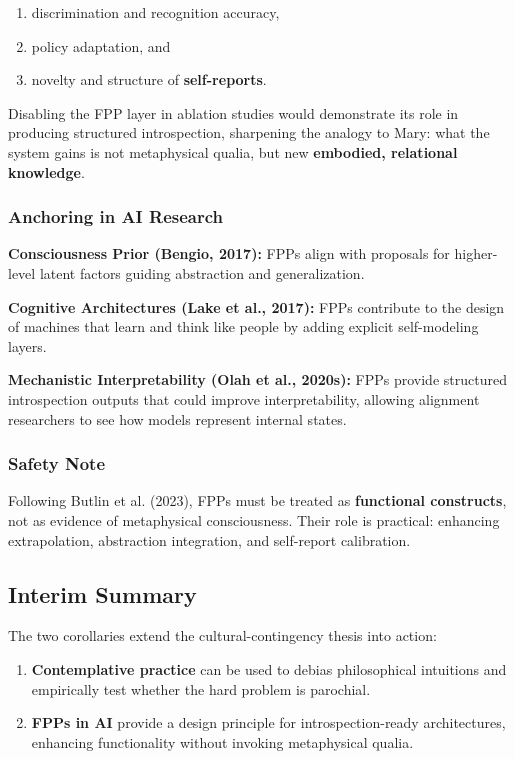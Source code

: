 \documentclass[11pt,a4paper]{article}
\begin{document}
\begin{enumerate}
\item discrimination and recognition accuracy,
\item policy adaptation, and
\item novelty and structure of \textbf{self-reports}.
\end{enumerate}

Disabling the FPP layer in ablation studies would demonstrate its role in producing structured introspection, sharpening the analogy to Mary: what the system gains is not metaphysical qualia, but new \textbf{embodied, relational knowledge}.

\subsubsection{Anchoring in AI Research}

\textbf{Consciousness Prior (Bengio, 2017):} FPPs align with proposals for higher-level latent factors guiding abstraction and generalization.

\textbf{Cognitive Architectures (Lake et al., 2017):} FPPs contribute to the design of machines that learn and think like people by adding explicit self-modeling layers.

\textbf{Mechanistic Interpretability (Olah et al., 2020s):} FPPs provide structured introspection outputs that could improve interpretability, allowing alignment researchers to see how models represent internal states.

\subsubsection{Safety Note}

Following Butlin et al. (2023), FPPs must be treated as \textbf{functional constructs}, not as evidence of metaphysical consciousness. Their role is practical: enhancing extrapolation, abstraction integration, and self-report calibration.

\subsection{Interim Summary}

The two corollaries extend the cultural-contingency thesis into action:

\begin{enumerate}
\item \textbf{Contemplative practice} can be used to debias philosophical intuitions and empirically test whether the hard problem is parochial.
\item \textbf{FPPs in AI} provide a design principle for introspection-ready architectures, enhancing functionality without invoking metaphysical qualia.
\end{enumerate}
\end{document}
